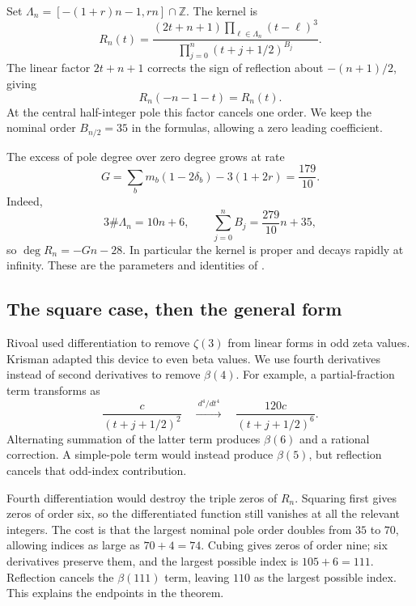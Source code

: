 \documentclass[11pt]{article}
\newcommand{\Z}{\mathbb Z}\newcommand{\Q}{\mathbb Q}
\begin{document}
Set $\Lambda_n=[-(1+r)n-1,rn]\cap\Z$. The kernel is
\begin{equation}\label{eq:R}
 R_n(t)=\frac{(2t+n+1)\prod_{\ell\in\Lambda_n}(t-\ell)^3}
 {\prod_{j=0}^n(t+j+1/2)^{B_j}}.
\end{equation}
The linear factor $2t+n+1$ corrects the sign of reflection about
$-(n+1)/2$, giving
\begin{equation}\label{eq:reflection}
 R_n(-n-1-t)=R_n(t).
\end{equation}
At the central half-integer pole this factor cancels one order. We keep
the nominal order $B_{n/2}=35$ in the formulas, allowing a zero leading
coefficient.

The excess of pole degree over zero degree grows at rate
\[
 G=\sum_bm_b(1-2\delta_b)-3(1+2r)=\frac{179}{10}.
\]
Indeed,
\[
 3\#\Lambda_n=10n+6,\qquad
 \sum_{j=0}^nB_j=\frac{279}{10}n+35,
\]
so $\deg R_n=-Gn-28$. In particular the kernel is proper and decays
rapidly at infinity. These are the parameters and identities of
\cite[Section 2]{krisman}.

\subsection{The square case, then the general form}
Rivoal \cite[Section 2, Lemma 1]{rivoal} used differentiation to remove
$\zeta(3)$ from linear forms in odd zeta values. Krisman
\cite[Section 1.2]{krisman} adapted this device to even beta values.
We use fourth derivatives instead of second derivatives to remove
$\beta(4)$. For example, a partial-fraction term transforms as
\[
 \frac{c}{(t+j+1/2)^2}
 \quad\xrightarrow{\ d^4/dt^4\ }\quad
 \frac{120c}{(t+j+1/2)^6}.
\]
Alternating summation of the latter term produces $\beta(6)$ and a
rational correction. A simple-pole term would instead produce
$\beta(5)$, but reflection cancels that odd-index contribution.

Fourth differentiation would destroy the triple zeros of $R_n$. Squaring
first gives zeros of order six, so the differentiated function still
vanishes at all the relevant integers. The cost is that the largest
nominal pole order doubles from $35$ to $70$, allowing indices as large
as $70+4=74$. Cubing gives zeros of order nine; six derivatives preserve
them, and the largest possible index is $105+6=111$. Reflection cancels
the $\beta(111)$ term, leaving $110$ as the largest possible index.
This explains the endpoints in the theorem.
\end{document}
